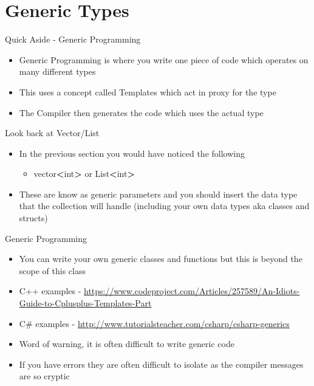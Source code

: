 \part{Generic Types}
\frame{\partpage}

\begin{frame}{Quick Aside - Generic Programming}
	\begin{itemize}
		\pause \item Generic Programming is where you write one piece of code which operates on many different types
		\pause \item This uses a concept called Templates which act in proxy for the type
		\pause \item The Compiler then generates the code which uses the actual type
	\end{itemize}
\end{frame}

\begin{frame}{Look back at Vector/List}
	\begin{itemize}
		\pause \item In the previous section you would have noticed the following
		\begin{itemize}
			\pause \item vector\textbf{\textless}int\textbf{\textgreater} or List\textbf{\textless}int\textbf{\textgreater} 
		\end{itemize} 
		\pause \item These are know as generic parameters and you should insert the data type that the collection will handle (including your own data types aka classes and structs)
	\end{itemize}
\end{frame}

\begin{frame}{Generic Programming}
	\begin{itemize}
		\pause \item You can write your own generic classes and functions but this is beyond the scope of this class
		\pause \item C++ examples - \url{https://www.codeproject.com/Articles/257589/An-Idiots-Guide-to-Cplusplus-Templates-Part}
		\pause \item C\# examples -
		\url{http://www.tutorialsteacher.com/csharp/csharp-generics}
		\pause \item Word of warning, it is often difficult to write generic code
		\pause \item If you have errors they are often difficult to isolate as the compiler messages are so cryptic
	\end{itemize}
\end{frame}
